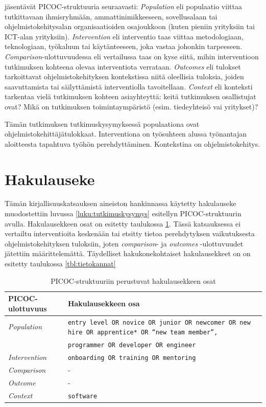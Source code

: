 \documentclass[utf8]{gradu3}
\begin{document}
\textcite{kitchenham-charters-2007} jäsentävät PICOC-struktuuria seuraavasti: \textit{Population} eli populaatio viittaa tutkittavaan ihmisryhmään, ammattinimikkeeseen, sovellusalaan tai ohjelmistokehitysalan organisaatioiden osajoukkoon (kuten pieniin yrityksiin tai ICT-alan yrityksiin). \textit{Intervention} eli interventio taas viittaa metodologiaan, teknologiaan, työkaluun tai käytänteeseen, joka vastaa johonkin tarpeeseen. \textit{Comparison}-ulottuvuudessa eli vertailussa taas on kyse siitä, mihin interventioon tutkimuksen kohteena olevaa interventiota verrataan. \textit{Outcomes} eli tulokset tarkoittavat ohjelmistokehityksen kontekstissa niitä oleellisia tuloksia, joiden saavuttamista tai säilyttämistä interventiolla tavoitellaan. \textit{Context} eli konteksti tarkentaa vielä tutkimuksen kohteen asiayhteyttä: keitä tutkimuksen osallistujat ovat? Mikä on tutkimuksen toimintaympäristö (esim. tiedeyhteisö vai yritykset)? \parencite{kitchenham-charters-2007}

Tämän tutkimuksen tutkimuskysymyksessä populaationa ovat ohjelmistokehittäjätulokkaat. Interventiona on työsuhteen alussa työnantajan aloitteesta tapahtuva työhön perehdyttäminen. Kontekstina on ohjelmistokehitys.

\section{Hakulauseke}

Tämän kirjallisuuskatsauksen aineiston hankinnassa käytetty hakulauseke muodostettiin luvussa  \ref{luku:tutkimuskysymys} esitellyn PICOC-struktuurin avulla. Hakulausekkeen osat on esitetty taulukossa \ref{tbl:picoc-ulottuvuudet}. Tässä katsauksessa ei vertailtu interventioita keskenään tai etsitty tietoa perehdytyksen vaikutuksesta ohjelmistokehityksen tuloksiin, joten \textit{comparison}- ja \textit{outcomes} -ulottuvuudet jätettiin määrittelemättä. Täydelliset hakukonekohtaiset hakulausekkeet on on esitetty taulukossa \ref{tbl:tietokannat}

\begin{table}[h]
    \footnotesize
    \begin{tabular}{lp{}}
        \toprule
        \textbf{PICOC-ulottuvuus} & \textbf{Hakulausekkeen osa} \\
        \midrule
        \textit{Population} & {\tt entry level OR novice OR junior OR newcomer OR new hire OR apprentice* OR ``new team member'', } \\
        & {\tt programmer OR developer OR engineer} \\
        \midrule
        \textit{Intervention} & {\tt onboarding OR training OR mentoring} \\
        \midrule
        \textit{Comparison} & - \\
        \midrule
        \textit{Outcome} & - \\
        \midrule
        \textit{Context} & {\tt software} \\
        \bottomrule
    \end{tabular}  
    \caption{PICOC-struktuuriin \parencite{kitchenham-charters-2007} perustuvat hakulausekkeen osat}
    \label{tbl:picoc-ulottuvuudet}
\end{table}
\end{document}
